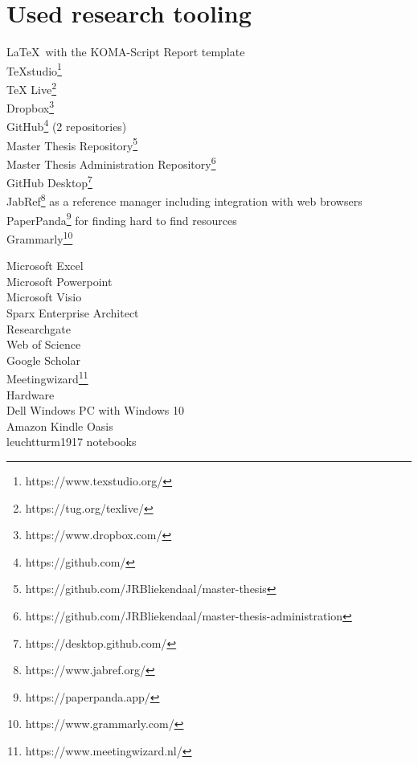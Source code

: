 \section{Used research tooling}

\LaTeX\ with the KOMA-Script Report template\\
TeXstudio\footnote{https://www.texstudio.org/}\\
TeX Live\footnote{https://tug.org/texlive/}\\
Dropbox\footnote{https://www.dropbox.com/}\\
GitHub\footnote{https://github.com/} (2 repositories) \\
	Master Thesis Repository\footnote{https://github.com/JRBliekendaal/master-thesis}\\
	Master Thesis Administration Repository\footnote{https://github.com/JRBliekendaal/master-thesis-administration}\\
GitHub Desktop\footnote{https://desktop.github.com/}\\
JabRef\footnote{https://www.jabref.org/} as a reference manager including integration with web browsers\\
PaperPanda\footnote{https://paperpanda.app/} for finding hard to find resources\\
Grammarly\footnote{https://www.grammarly.com/}

Microsoft Excel\\
Microsoft Powerpoint\\
Microsoft Visio\\
Sparx Enterprise Architect\\


Researchgate\\
Web of Science\\
Google Scholar\\
Meetingwizard\footnote{https://www.meetingwizard.nl/}\\


Hardware\\
Dell Windows PC with Windows 10\\
Amazon Kindle Oasis\\

leuchtturm1917 notebooks\\
